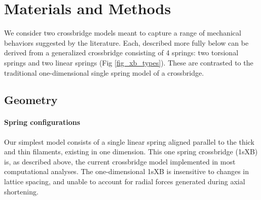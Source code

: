 \documentclass[]{article}
\begin{document}



\section{Materials and Methods}  %


We consider two crossbridge models meant to capture a range of mechanical behaviors suggested by the literature.  
Each, described more fully below can be derived from a generalized crossbridge consisting of 4 springs:  two torsional springs and two linear springs (Fig \ref{fig_xb_types}).  
These are contrasted to the traditional one-dimensional single spring model of a crossbridge.

\subsection*{Geometry} %

\paragraph{Spring configurations} %
Our simplest model consists of a single linear spring aligned parallel to the thick and thin filaments, existing in one dimension.
This one spring crossbridge (1sXB) is, as described above, the current crossbridge model implemented in most computational analyses. 
The one-dimensional 1sXB is insensitive to changes in lattice spacing, and unable to account for radial forces generated during axial shortening.
\end{document}
